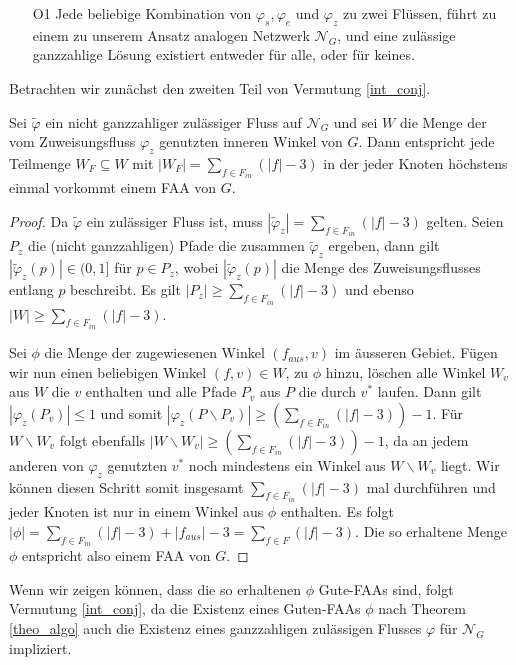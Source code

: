 \begin{itemize}
\item [O1] Jede beliebige Kombination von $\varphi_s,\varphi_e$ und $\varphi_z$ zu zwei Flüssen, führt zu einem zu unserem Ansatz analogen Netzwerk $\mathcal{N}_G$, und eine zulässige ganzzahlige Lösung existiert entweder für alle, oder für keines.
\end{itemize}

Betrachten wir zunächst den zweiten Teil von Vermutung \ref{int_conj}.

\begin{lemma}\label{lem_faa}
Sei $\tilde{\varphi}$ ein nicht ganzzahliger zulässiger Fluss auf $\mathcal{N}_G$ und sei $W$ die Menge der vom Zuweisungsfluss $\varphi_z$ genutzten inneren Winkel von $G$. Dann entspricht jede Teilmenge $W_{F}\subseteq W$ mit $|W_F| = \sum_{f \in F_{in}}(|f|-3)$ in der jeder Knoten höchstens einmal vorkommt einem FAA von $G$.
\end{lemma}

\begin{proof}
Da $\tilde{\varphi}$ ein zulässiger Fluss ist, muss $|\tilde{\varphi}_z| = \sum_{f \in F_{in}}(|f|-3)$ gelten. Seien $P_z$ die (nicht ganzzahligen) Pfade die zusammen $\tilde{\varphi}_z$ ergeben, dann gilt $|\tilde{\varphi}_z(p)| \in (0,1]$ für $p \in P_z$, wobei $|\tilde{\varphi}_z(p)|$ die Menge des Zuweisungsflusses entlang $p$ beschreibt. Es gilt $|P_z| \geq \sum_{f \in F_{in}}(|f|-3)$ und ebenso $|W| \geq \sum_{f \in F_{in}}(|f|-3)$.

Sei $\phi$ die Menge der zugewiesenen Winkel $(f_{aus},v)$ im äusseren Gebiet. Fügen wir nun einen beliebigen Winkel $(f,v)\in W$, zu $\phi$ hinzu, löschen alle Winkel $W_v$ aus $W$ die $v$ enthalten und alle Pfade $P_v$ aus $P$ die durch $v^*$ laufen. Dann gilt $|\varphi_z(P_v)| \leq 1$ und somit $|\varphi_z(P\backslash P_v)| \geq (\sum_{f \in F_{in}}(|f|-3)) - 1$. Für $W \backslash W_v$ folgt ebenfalls $|W \backslash W_v| \geq (\sum_{f \in F_{in}}(|f|-3))- 1$, da an jedem anderen von $\varphi_z$ genutzten $v^*$ noch mindestens ein Winkel aus $W\backslash W_v$ liegt. Wir können diesen Schritt somit insgesamt $\sum_{f \in F_{in}}(|f|-3)$ mal durchführen und jeder Knoten ist nur in einem Winkel aus $\phi$ enthalten. Es folgt $|\phi| = \sum_{f \in F_{in}}(|f|-3) + |f_{aus}| - 3 = \sum_{f \in F}(|f|-3)$. Die so erhaltene Menge $\phi$ entspricht also einem FAA von $G$.
\end{proof}

Wenn wir zeigen können, dass die so erhaltenen $\phi$ Gute-FAAs sind, folgt Vermutung \ref{int_conj}, da die Existenz eines Guten-FAAs $\phi$ nach Theorem \ref{theo_algo} auch die Existenz eines ganzzahligen zulässigen Flusses $\varphi$ für $\mathcal{N}_G$ impliziert.

